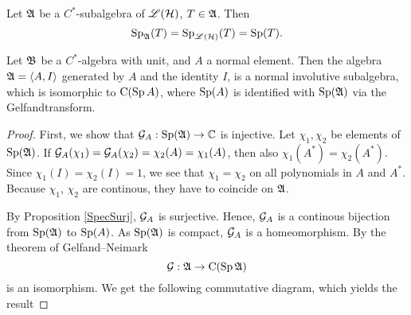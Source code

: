 \begin{cor}
 Let $\mathfrak{A}$ be a $C^*$-subalgebra of $\mathscr{L}(\mathcal{H})$, $T \in \mathfrak{A}$. Then 
\[
 \operatorname{Sp}_{\mathfrak{A}} (T) = \operatorname{Sp}_{\mathscr{L}(\mathcal{H})}(T) = \operatorname{Sp}(T).
\]
\end{cor}

\begin{prop}\label{boundedfunccalc}
 Let $\mathfrak{B}$ be a $C^*$-algebra with unit, and $A$ a normal element.
 Then the algebra $\mathfrak{A} = \left\langle A, I \right\rangle$ generated by $A$ and the identity $I$, is a
 normal involutive subalgebra, which is isomorphic to 
 $\operatorname{C} (\operatorname{Sp} A)$, where $\operatorname{Sp}(A)$ is identified with $\operatorname{Sp}(\mathfrak{A})$ via the Gelfandtransform.
\end{prop}

\begin{proof}
 First, we show that $\mathcal{G}_A : \operatorname{Sp}(\mathfrak{A}) \to \mathbb{C}$ is injective. Let 
 $\chi_1 , \chi_2$ be elements of $\operatorname{Sp}(\mathfrak{A})$. If $\mathcal{G}_A(\chi_1) = \mathcal{G}_A(\chi_2)=
 \chi_2(A)=\chi_1(A)$, then also $\chi_1(A^*)=\chi_2(A^*)$. Since 
 $\chi_1(I)=\chi_2(I)=1$, we see that $\chi_1 = \chi_2$ on all polynomials
 in $A$ and $A^*$. Because $\chi_1$, $\chi_2$ are continous, they have to coincide on
 $\mathfrak{A}$. 
 
 By Proposition \ref{SpecSurj}, $\mathcal{G}_A$ is surjective. Hence, $\mathcal{G}_A$ is a continous bijection 
 from $\operatorname{Sp}(\mathfrak{A})$ to $\operatorname{Sp}(A)$. As $\operatorname{Sp}(\mathfrak{A})$ is compact,
 $\mathcal{G}_A$ is a homeomorphism.
By the theorem of Gelfand--Neimark 
\[
 \mathcal{G} : \mathfrak{A} \to \operatorname{C}(\operatorname{Sp} \mathfrak{A})
\]
is an isomorphism. We get the following commutative diagram, which yields the result

% 
% 
%  
% 
%   


\end{proof}
